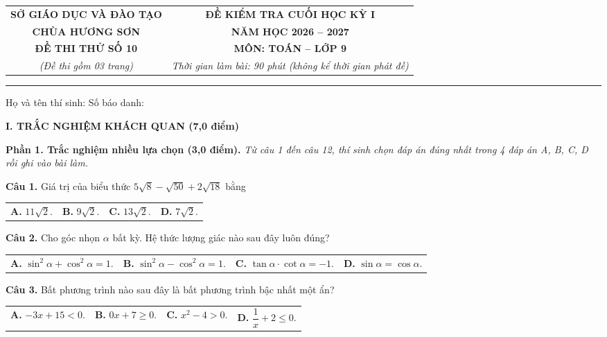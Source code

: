 \documentclass[11pt,a4paper]{article}
\begin{document}
\noindent
\begin{tabular*}{\linewidth}{@{\extracolsep{\fill}}cc@{}}
\textbf{SỞ GIÁO DỤC VÀ ĐÀO TẠO} & \textbf{ĐỀ KIỂM TRA CUỐI HỌC KỲ I} \\
\textbf{CHÙA HƯƠNG SƠN} & \textbf{NĂM HỌC 2026 -- 2027} \\
\textbf{ĐỀ THI THỬ SỐ 10} & \textbf{MÔN: TOÁN -- LỚP 9} \\
\textit{(Đề thi gồm 03 trang)} & \textit{Thời gian làm bài: 90 phút (không kể thời gian phát đề)} \\
\end{tabular*}

\vspace{2mm}
\noindent
\rule{\linewidth}{0.8pt}

\vspace{1mm}
\noindent
Họ và tên thí sinh: \dotfill Số báo danh: \dotfill

\vspace{2mm}
\noindent
\textbf{\large I. TRẮC NGHIỆM KHÁCH QUAN (7,0 điểm)}

\vspace{1mm}
\noindent
\textbf{Phần 1. Trắc nghiệm nhiều lựa chọn (3,0 điểm).} \textit{Từ câu 1 đến câu 12, thí sinh chọn đáp án đúng nhất trong 4 đáp án A, B, C, D rồi ghi vào bài làm.}

\vspace{1.5mm}
\textbf{Câu 1.} Giá trị của biểu thức $5\sqrt{8} - \sqrt{50} + 2\sqrt{18}$ bằng\\
\begin{tabularx}{\linewidth}{XXXX}
\textbf{A.} $11\sqrt{2}$. & \textbf{B.} $9\sqrt{2}$. & \textbf{C.} $13\sqrt{2}$. & \textbf{D.} $7\sqrt{2}$.
\end{tabularx}

\vspace{1.5mm}
\textbf{Câu 2.} Cho góc nhọn $\alpha$ bất kỳ. Hệ thức lượng giác nào sau đây luôn đúng?\\
\begin{tabularx}{\linewidth}{XXXX}
\textbf{A.} $\sin^2 \alpha + \cos^2 \alpha = 1$. & \textbf{B.} $\sin^2 \alpha - \cos^2 \alpha = 1$. & \textbf{C.} $\tan \alpha \cdot \cot \alpha = -1$. & \textbf{D.} $\sin \alpha = \cos \alpha$.
\end{tabularx}

\vspace{1.5mm}
\textbf{Câu 3.} Bất phương trình nào sau đây là bất phương trình bậc nhất một ẩn?\\
\begin{tabularx}{\linewidth}{XXXX}
\textbf{A.} $-3x + 15 < 0$. & \textbf{B.} $0x + 7 \ge 0$. & \textbf{C.} $x^2 - 4 > 0$. & \textbf{D.} $\dfrac{1}{x} + 2 \le 0$.
\end{tabularx}
\end{document}
